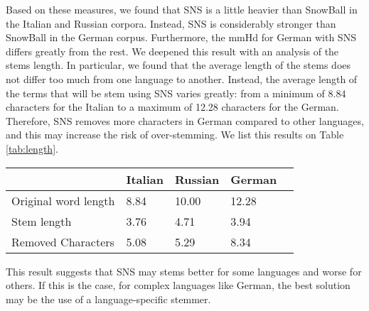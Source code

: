 Based on these measures, we found that SNS is a little heavier than SnowBall in the Italian and Russian corpora. Instead, SNS is considerably stronger than SnowBall in the German corpus. Furthermore, the mmHd for German with SNS differs greatly from the rest. We deepened this result with an analysis of the stems length. In particular, we found that the average length of the stems does not differ too much from one language to another. Instead, the average length of the terms that will be stem using SNS varies greatly: from a minimum of 8.84 characters for the Italian to a maximum of 12.28 characters for the German. Therefore, SNS removes more characters in German compared to other languages, and this may increase the risk of over-stemming. We list this results on Table \ref{tab:length}.

\begin{center}
   \begin{tabular}{| l | l | l | l | l |}
    \hline
    & Italian & Russian & German\\ \hline
    Original word length & 8.84 & 10.00 & 12.28\\ \hline
    Stem length & 3.76 & 4.71 & 3.94\\ \hline   
    Removed Characters & 5.08 & 5.29 &  8.34\\ \hline
    \end{tabular}
    \label{tab:length}
\end{center}

This result suggests that SNS may stems better for some languages and worse for others. If this is the case, for complex languages like German, the best solution may be the use of a language-specific stemmer.  